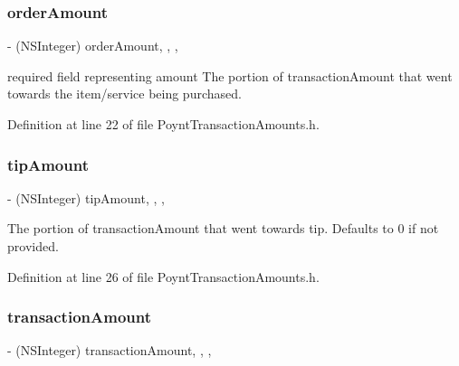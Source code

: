 \subsubsection{\texorpdfstring{order\+Amount}{orderAmount}}
{\footnotesize\ttfamily -\/ (N\+S\+Integer) order\+Amount\hspace{0.3cm}{\ttfamily [read]}, {\ttfamily [write]}, {\ttfamily [nonatomic]}, {\ttfamily [assign]}}



required field representing amount  The portion of transaction\+Amount that went towards the item/service being purchased. 



Definition at line 22 of file Poynt\+Transaction\+Amounts.\+h.

\hypertarget{interface_poynt_transaction_amounts_ae4a2e64d79032bc8bb25305486b23859}{}\label{interface_poynt_transaction_amounts_ae4a2e64d79032bc8bb25305486b23859} 
\subsubsection{\texorpdfstring{tip\+Amount}{tipAmount}}
{\footnotesize\ttfamily -\/ (N\+S\+Integer) tip\+Amount\hspace{0.3cm}{\ttfamily [read]}, {\ttfamily [write]}, {\ttfamily [nonatomic]}, {\ttfamily [assign]}}

The portion of transaction\+Amount that went towards tip. Defaults to 0 if not provided. 

Definition at line 26 of file Poynt\+Transaction\+Amounts.\+h.

\hypertarget{interface_poynt_transaction_amounts_aea3b857ebe452c1822cdd05e35cd2769}{}\label{interface_poynt_transaction_amounts_aea3b857ebe452c1822cdd05e35cd2769} 
\subsubsection{\texorpdfstring{transaction\+Amount}{transactionAmount}}
{\footnotesize\ttfamily -\/ (N\+S\+Integer) transaction\+Amount\hspace{0.3cm}{\ttfamily [read]}, {\ttfamily [write]}, {\ttfamily [nonatomic]}, {\ttfamily [assign]}}



